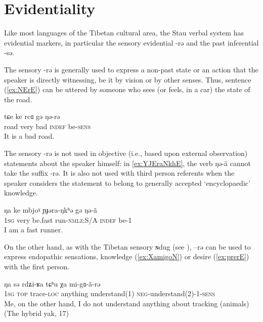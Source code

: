 \documentclass[oneside,a4paper,11pt]{article}
\newcommand{\ipa}[1]{{\phon #1}} %
\begin{document}
\section{Evidentiality}

Like most languages of the Tibetan cultural area, the Stau verbal system has evidential markers, in particular the sensory evidential \ipa{-rə} and the past inferential \ipa{-sə}.

The sensory  \ipa{-rə} is generally used to express a non-past state or an action that the speaker is directly witnessing, be it by vision or by other senses. Thus, sentence (\ref{ex:NErE}) can be uttered by someone who sees (or feels, in a car) the state of the road.

 \begin{exe}
\ex \label{ex:NErE}
\gll
\ipa{tɕe} 	\ipa{ke} 	\ipa{rcɞ} 	\ipa{gə} 	\ipa{ŋə-rə}  \\
road very bad \textsc{indef} be-\textsc{sens} \\
\glt It is a bad road.
 \end{exe}
 
The sensory \ipa{-rə} is not used in objective (i.e., based upon external observation) statements about the speaker himself: in \ref{ex:YJEraNkhE},  the verb \ipa{ŋə-ã} cannot take  the suffix \ipa{-rə}. It is also not used with third person referents when the speaker  considers the statement  to belong to generally accepted `encyclopaedic' knowledge. 

  \begin{exe}
\ex \label{ex:YJEraNkhE}
\gll
  \ipa{ŋa} 	\ipa{ke} \ipa{mbjoˠ} 	\ipa{ɲɟəra-ŋkʰə} 	\ipa{gə} 	\ipa{ŋə-ã} \\
\textsc{1sg} very be.fast run-\textsc{nmlz}:S/A \textsc{indef} be-1 \\
\glt I am a fast runner.
  \end{exe}
  
 
  
On the other hand, as with the Tibetan sensory \ipa{ɴdug} (see \citealt{tournadre14evidentiality}), \ipa{--rə}  can be used to express endopathic sensations, knowledge (\ref{ex:XamigoN}) or desire (\ref{ex:prerE}) with the first person.

\begin{exe}
\ex \label{ex:XamigoN}
\gll
\ipa{ŋa} 	\ipa{sə} 	\ipa{rdʑi-ʁa} 	\ipa{tɕʰu} 	\ipa{χa} 	\ipa{mi-gɞ-ã-rə} 	\\
\textsc{1sg} \textsc{top} trace-\textsc{loc} anything understand(1) \textsc{neg}-understand(2)-1-\textsc{sens} \\
\glt Me, on the other hand, I do not understand anything about tracking (animals) (The hybrid yak, 17)
\end{exe}
\end{document}
